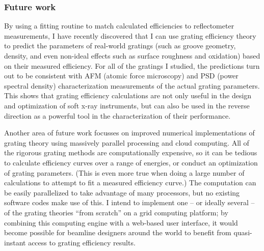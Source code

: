 \documentclass[singlespace,proposal]{uofsthesis-cs}
\begin{document}
\subsubsection{Future work}
By using a fitting routine to match calculated efficiencies to reflectometer measurements, I have recently discovered that I can use grating efficiency theory to predict the parameters of real-world gratings (such as groove geometry, density, and even non-ideal effects such as surface roughness and oxidation) based on their measured efficiency.  For all of the gratings I studied, the predictions turn out to be consistent with AFM (atomic force microscopy) and PSD (power spectral density) characterization measurements of the actual grating parameters.  This shows that grating efficiency calculations are not only useful in the design and optimization of soft x-ray instruments, but can also be used in the reverse direction as a powerful tool in the characterization of their performance.

Another area of future work focusses on improved numerical implementations of grating theory using massively parallel processing and cloud computing.  All of the rigorous grating methods are computationally expensive, so it can be tedious to calculate efficiency curves over a range of energies, or conduct an optimization of grating parameters. (This is even more true when doing a large number of calculations to attempt to fit a measured efficiency curve.)  The computation can be easily parallelized to take advantage of many processors, but no existing software codes make use of this.  I intend to implement one -- or ideally several -- of the grating theories ``from scratch'' on a grid computing platform; by combining this computing engine with a web-based user interface, it would become possible for beamline designers around the world to benefit from quasi-instant access to grating efficiency results.

%



%

\end{document}
